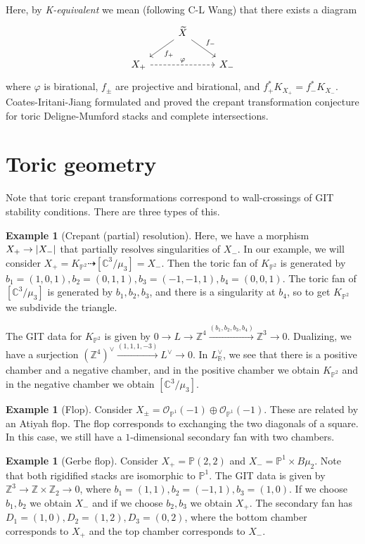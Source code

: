 \documentclass[leqno, openany]{memoir}
\theoremstyle{definition}
\newtheorem{exm}[thm]{Example}
\theoremstyle{remark}
\theoremstyle{plain}
\theoremstyle{definition}
\theoremstyle{remark}
\newcommand{\R}{\mathbb{R}}
\newcommand{\C}{\mathbb{C}}
\newcommand{\Z}{\mathbb{Z}}
\renewcommand{\P}{\mathbb{P}}
\newcommand{\mc}[1]{\mathcal{#1}}
\newcommand{\wt}[1]{\widetilde{#1}}
\begin{document}
Here, by \textit{K-equivalent} we mean (following C-L Wang) that there exists a diagram
\begin{equation*}
\begin{tikzcd}
    & \wt{X} \ar{dl}{f_+} \ar{dr}{f_-} \\
    X_+ \ar[dashrightarrow]{rr}{\varphi} & & X_-
\end{tikzcd}
\end{equation*}
where $\varphi$ is birational, $f_{\pm}$ are projective and birational, and $f_+^* K_{X_+} = f_-^* K_{X_-}$. Coates-Iritani-Jiang formulated and proved the crepant transformation conjecture for toric Deligne-Mumford stacks and complete intersections.

\section{Toric geometry}
Note that toric crepant transformations correspond to wall-crossings of GIT stability conditions. There are three types of this.

\begin{exm}[Crepant (partial) resolution]
    Here, we have a morphism $X_+ \to \abs{X_-}$ that partially resolves singularities of $X_-$. In our example, we will consider $X_+ = K_{\P^2} \dashrightarrow [\C^3 / \mu_3] = X_-$. Then the toric fan of $K_{\P^2}$ is generated by $b_1 = (1,0,1), b_2 = (0,1,1), b_3 = (-1,-1,1), b_4 = (0,0,1)$. The toric fan of $[\C^3 / \mu_3]$ is generated by $b_1, b_2, b_3$, and there is a singularity at $b_4$, so to get $K_{\P^2}$ we subdivide the triangle.

    The GIT data for $K_{\P^2}$ is given by $0 \to L \to \Z^4 \xrightarrow{(b_1, b_2, b_3, b_4)} \Z^3 \to 0$. Dualizing, we have a surjection $(\Z^4)^{\vee} \xrightarrow{(1,1,1,-3)} L^{\vee} \to 0$. In $L_{\R}^{\vee}$, we see that there is a positive chamber and a negative chamber, and in the positive chamber we obtain $K_{\P^2}$ and in the negative chamber we obtain $[\C^3 / \mu_3]$.
\end{exm}

\begin{exm}[Flop]
    Consider $X_{\pm} = \mc{O}_{\P^1}(-1) \oplus \mc{O}_{\P^1}(-1)$. These are related by an Atiyah flop. The flop corresponds to exchanging the two diagonals of a square. In this case, we still have a $1$-dimensional secondary fan with two chambers.
\end{exm}

\begin{exm}[Gerbe flop]
    Consider $X_+ = \P(2,2)$ and $X_- = \P^1 \times B\mu_2$. Note that both rigidified stacks are isomorphic to $\P^1$. The GIT data is given by $\Z^3 \to \Z \times \Z_2 \to 0$, where $b_1 =(1,1), b_2 = (-1,1), b_3 = (1,0)$. If we choose $b_1, b_2$ we obtain $X_-$ and if we choose $b_2, b_3$ we obtain $X_+$. The secondary fan has $D_1 = (1,0), D_2 = (1,2), D_3 = (0,2)$, where the bottom chamber corresponds to $X_+$ and the top chamber corresponds to $X_-$.
\end{exm}
\end{document}
